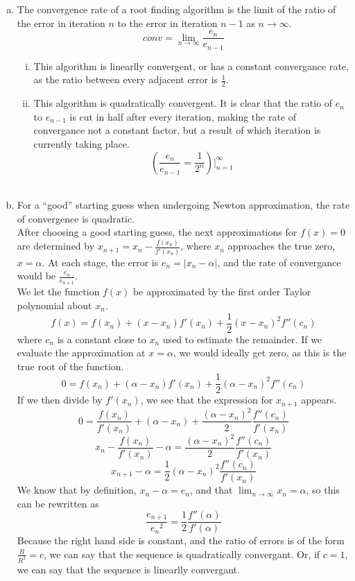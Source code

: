 \documentclass[11pt]{article}
\begin{document}
\begin{enumerate}
\begin{enumerate}[(a)]
		\item The convergence rate of a root finding algorithm is the limit of the ratio of the error in iteration $n$ to the error in
		iteration $n-1$ as $n \rightarrow \infty$.
		$$conv = \lim_{n\to\infty} \frac{e_n}{e_{n-1}}$$

		\begin{enumerate}[i.]

			\item This algorithm is linearlly convergent, or has a constant convergance rate, as the ratio between every adjacent
			error is $\frac{1}{2}$.

			\item This algorithm is quadratically convergent. It is clear that the ratio of $e_n$ to $e_{n-1}$ is cut in half
			after every iteration, making the rate of convergance not a constant factor, but a result of which iteration is
			currently taking place.
			$$(\frac{e_n}{e_{n-1}} = \frac{1}{2^n})|_{n=1}^{\infty}$$ \\

		\end{enumerate}

		\item For a ``good'' starting guess when undergoing Newton approximation, the rate of convergence is quadratic. \\

			After choosing a good starting guess, the next approximations for $f(x)=0$ are determined by $x_{n+1} = x_n-\frac{f(x_n)}{f'(x_n)}$, where
			$x_n$ approaches the true zero, $x=\alpha$. At each stage, the error is $e_n = |x_n-\alpha|$, and the rate of convergance would be
			$\frac{e_n}{e_{n+1}}$. \\

			We let the function $f(x)$ be approximated by the first order Taylor polynomial about $x_n$.
			$$f(x) = f(x_n) + (x-x_n)f'(x_n) + \frac{1}{2} (x-x_n)^2f''(c_n)$$
			where $c_n$ is a constant close to $x_n$ used to estimate the remainder. If we evaluate the approximation at $x=\alpha$, we would ideally get zero,
			as this is the true root of the function.
			$$0 = f(x_n) + (\alpha - x_n)f'(x_n) + \frac{1}{2} (\alpha-x_n)^2f''(c_n)$$
			If we then divide by $f'(x_n)$, we see that the expression for $x_{n+1}$ appears.
			$$0 = \frac{f(x_n)}{f'(x_n)}+(\alpha-x_n) + \frac{(\alpha-x_n)^2}{2} \frac{f''(c_n)}{f'(x_n)} $$
			$$x_n - \frac{f(x_n)}{f'(x_n)} - \alpha = \frac{(\alpha-x_n)^2}{2} \frac{f''(c_n)}{f'(x_n)} $$
			$$x_{n+1}-\alpha = \frac{1}{2} (\alpha - x_n)^2 \frac{f''(c_n)}{f'(x_n)} $$
			We know that by definition, $x_n-\alpha = e_n$, and that $\lim_{n\to\infty}x_n = \alpha$,  so this can be rewritten as
			$$\frac{e_{n+1}}{{e_n}^2} = \frac{1}{2}\frac{f''(\alpha)}{f'(\alpha)} $$
			Because the right hand side is constant, and the ratio of errors is of the form $\frac{R}{R^2} = c$, we can say that the sequence is
			quadratically convergant. Or, if $c= 1$, we can say that the sequence is linearlly convergant. \\


\end{enumerate}
\end{enumerate}
\end{document}
